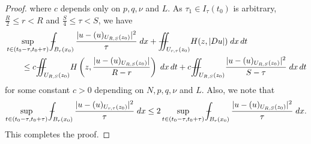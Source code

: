 \documentclass[notitlepage,11pt,reqno]{amsart}
\theoremstyle{definition}
\numberwithin{equation}{section}
\newcommand{\iintss}{{\int\hspace{-0.28cm}\int}}
\newcommand{ \miints }{{\iintss\hspace{-0.56cm} -\hspace{-0.15cm}-}}
\newcommand{\miint}[1]{{\miints_{\hspace{-0.13cm}#1}}}
\def\Xint#1{\mathchoice
	{\XXint\displaystyle\textstyle{#1}}%
	{\XXint\textstyle\scriptstyle{#1}}%
	{\XXint\scriptstyle\scriptscriptstyle{#1}}%
	{\XXint\scriptscriptstyle\scriptscriptstyle{#1}}%
	\!\int}
\def\XXint#1#2#3{{\setbox0=\hbox{$#1{#2#3}{\int}$}
		\vcenter{\hbox{$#2#3$}}\kern-.50\wd0}}
\def\Xint#1{\mathchoice
	{\XXint\displaystyle\textstyle{#1}}%
	{\XXint\textstyle\scriptstyle{#1}}%
	{\XXint\scriptstyle\scriptscriptstyle{#1}}%
	{\XXint\scriptscriptstyle\scriptscriptstyle{#1}}%
	\!\int}
\def\XXint#1#2#3{{\setbox0=\hbox{$#1{#2#3}{\int}$}
		\vcenter{\hbox{$#2#3$}}\kern-.50\wd0}}
\def\dashint{\Xint-}
\begin{document}
\begin{proof}
    where $c$ depends only on $p,q,\nu$ and $L$. As $\tau_1\in I_\tau(t_0)$ is arbitrary, $\frac{R}{2}\leq r <R$ and $\frac{S}{4}\leq \tau < S$, we have
    \begin{align*}
        &\sup_{t\in (t_0-\tau,t_0+\tau)}\dashint_{B_r(x_0)} \frac{|u-(u)_{U_{R, S}(z_0)}|^2}{\tau}\; dx + \miint{U_{r,\tau}(z_0)} H(z,|Du|) \;dx\, dt\\
        &\qquad \leq c\miint{U_{R,S}(z_0)} H\left(z,\frac{|u-(u)_{U_{R, S}(z_0)}|}{R-r}\right)\; dx\, dt+ c \miint{U_{R,S}(z_0)}\frac{|u-(u)_{U_{R,S}(z_0)}|^2}{S-\tau} \; dx\, dt
    \end{align*}
    for some constant $c>0$ depending on $N,p,q,\nu$ and $L$. Also, we note that
    \begin{equation*}
        \sup_{t\in (t_0-\tau,t_0+\tau)}\dashint_{B_r(x_0)} \frac{|u-(u)_{U_{r, \tau}(z_0)}|^2}{\tau}\; dx \leq 2\sup_{t\in (t_0-\tau,t_0+\tau)}\dashint_{B_r(x_0)} \frac{|u-(u)_{U_{R, S}(z_0)}|^2}{\tau}\; dx.
    \end{equation*}
     This completes the proof.
\end{proof}  
\end{document}
